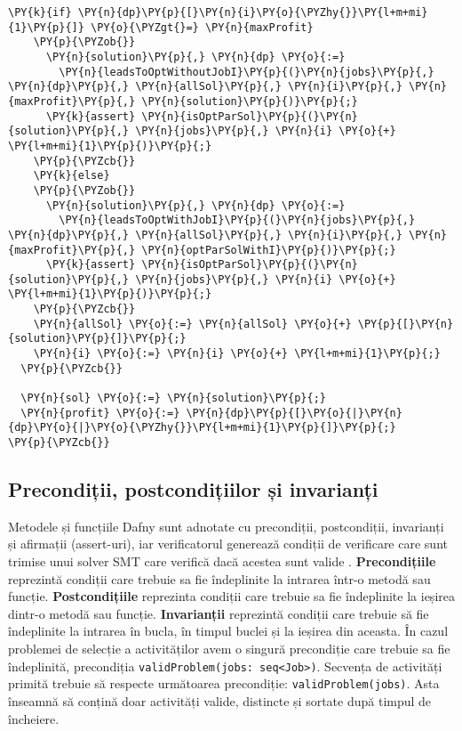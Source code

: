 \begin{Verbatim}[commandchars=\\\{\}, fontsize=\footnotesize]
    \PY{k}{if} \PY{n}{dp}\PY{p}{[}\PY{n}{i}\PY{o}{\PYZhy{}}\PY{l+m+mi}{1}\PY{p}{]} \PY{o}{\PYZgt{}=} \PY{n}{maxProfit}
    \PY{p}{\PYZob{}}
      \PY{n}{solution}\PY{p}{,} \PY{n}{dp} \PY{o}{:=}
        \PY{n}{leadsToOptWithoutJobI}\PY{p}{(}\PY{n}{jobs}\PY{p}{,} \PY{n}{dp}\PY{p}{,} \PY{n}{allSol}\PY{p}{,} \PY{n}{i}\PY{p}{,} \PY{n}{maxProfit}\PY{p}{,} \PY{n}{solution}\PY{p}{)}\PY{p}{;}
      \PY{k}{assert} \PY{n}{isOptParSol}\PY{p}{(}\PY{n}{solution}\PY{p}{,} \PY{n}{jobs}\PY{p}{,} \PY{n}{i} \PY{o}{+} \PY{l+m+mi}{1}\PY{p}{)}\PY{p}{;}
    \PY{p}{\PYZcb{}}
    \PY{k}{else}
    \PY{p}{\PYZob{}}
      \PY{n}{solution}\PY{p}{,} \PY{n}{dp} \PY{o}{:=} 
        \PY{n}{leadsToOptWithJobI}\PY{p}{(}\PY{n}{jobs}\PY{p}{,} \PY{n}{dp}\PY{p}{,} \PY{n}{allSol}\PY{p}{,} \PY{n}{i}\PY{p}{,} \PY{n}{maxProfit}\PY{p}{,} \PY{n}{optParSolWithI}\PY{p}{)}\PY{p}{;}
      \PY{k}{assert} \PY{n}{isOptParSol}\PY{p}{(}\PY{n}{solution}\PY{p}{,} \PY{n}{jobs}\PY{p}{,} \PY{n}{i} \PY{o}{+} \PY{l+m+mi}{1}\PY{p}{)}\PY{p}{;}
    \PY{p}{\PYZcb{}}
    \PY{n}{allSol} \PY{o}{:=} \PY{n}{allSol} \PY{o}{+} \PY{p}{[}\PY{n}{solution}\PY{p}{]}\PY{p}{;} 
    \PY{n}{i} \PY{o}{:=} \PY{n}{i} \PY{o}{+} \PY{l+m+mi}{1}\PY{p}{;}
  \PY{p}{\PYZcb{}}

  \PY{n}{sol} \PY{o}{:=} \PY{n}{solution}\PY{p}{;}
  \PY{n}{profit} \PY{o}{:=} \PY{n}{dp}\PY{p}{[}\PY{o}{|}\PY{n}{dp}\PY{o}{|}\PY{o}{\PYZhy{}}\PY{l+m+mi}{1}\PY{p}{]}\PY{p}{;} 
\PY{p}{\PYZcb{}}
\end{Verbatim}


\subsection{Precondiții, postcondițiilor și invarianți}
Metodele și funcțiile Dafny sunt adnotate cu precondiții, postcondiții, invarianți și afirmații (assert-uri), iar verificatorul generează condiții de verificare care sunt trimise unui solver SMT care verifică
dacă acestea sunt valide \citep{dafny-reference-manual}.
\textbf{Precondițiile} reprezintă condiții care trebuie sa fie îndeplinite la intrarea într-o metodă sau funcție. \textbf{Postcondițiile} reprezinta condiții care trebuie sa fie îndeplinite la ieșirea dintr-o metodă sau funcție.
\textbf{Invarianții} reprezintă condiții care trebuie să fie îndeplinite la intrarea în bucla, în timpul buclei și la ieșirea din aceasta. În cazul problemei de selecție a activităților avem o singură precondiție care trebuie sa fie îndeplinită,  precondiția \texttt{validProblem(jobs: seq<Job>)}. Secvența de activități primită trebuie să respecte următoarea precondiție: 
\texttt{validProblem(jobs)}. Asta înseamnă să conțină doar activități valide, distincte și sortate după timpul de încheiere. 

